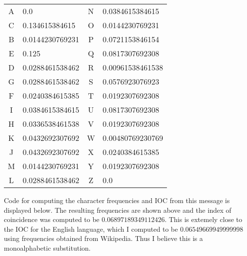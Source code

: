\documentclass[12pt]{article}
\begin{document}
\begin{table}[h!]
  \centering
  \small
  \begin{tabular}{c|l|c|l}
A & 0.0 & N & 0.0384615384615\\
C & 0.134615384615 & O & 0.0144230769231 \\
B & 0.0144230769231&P & 0.0721153846154 \\
E & 0.125&Q & 0.0817307692308 \\
D & 0.0288461538462 &R & 0.00961538461538\\
G & 0.0288461538462 &S & 0.0576923076923\\
F & 0.0240384615385 &T & 0.0192307692308\\
I & 0.0384615384615 &U & 0.0817307692308\\
H & 0.0336538461538 &V & 0.0192307692308\\
K & 0.0432692307692 &W & 0.00480769230769\\
J & 0.0432692307692 &X & 0.0240384615385 \\
M & 0.0144230769231 &Y & 0.0192307692308\\
L & 0.0288461538462 &Z & 0.0\\
\end{tabular}
\end{table}

Code for computing the character frequencies and IOC from this message is displayed below. 
The resulting frequencies are shown above and the 
index of coincidence was computed to be $0.06897189349112426$. This is extemely close to the IOC for the English language, which I computed to be 
$0.06549669949999998$ using frequencies obtained from Wikipedia. Thus I believe this is a monoalphabetic substitution.
\end{document}
